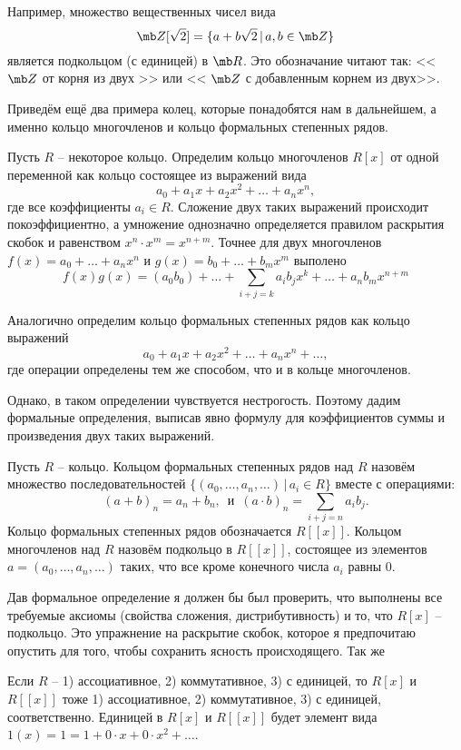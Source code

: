 \rm Например, множество вещественных чисел вида 
$$\mb Z[\sqrt{2}]=\{a+b\sqrt{2}\,|\, a,b \in \mb Z\} $$
является подкольцом (с единицей) в $\mb R$. Это обозначание читают так: << $\mb Z$ от корня из двух >> или << $\mb Z$ с добавленным корнем из двух>>. 
\erm




Приведём ещё два примера колец, которые понадобятся нам в дальнейшем, а именно кольцо многочленов и кольцо
формальных степенных рядов.



 Пусть $R$ – некоторое кольцо. Определим кольцо многочленов $R[x]$ от
одной переменной как кольцо состоящее из выражений вида
$$a_0+a_1x+a_2x^2+\dots+a_nx^n,$$
где все коэффициенты $a_i\in R$. Сложение двух таких выражений происходит покоэффициентно, а умножение однозначно определяется правилом раскрытия скобок и равенством $x^n\cdot x^m=x^{n+m}.$ Точнее для двух многочленов $f(x)=a_0+\dots+a_nx^n$ и $g(x)=b_0+\dots+b_mx^m$ выполено
$$f(x)g(x)= (a_0b_0)+ \dots+\sum_{i+j=k}a_ib_j x^k+\dots+a_nb_mx^{n+m}$$
\edfn

 Аналогично определим кольцо формальных степенных рядов как кольцо выражений
$$a_0+a_1x+a_2x^2+\dots+a_nx^n+\dots,$$
где операции определены тем же способом, что и в кольце многочленов.
\edfn

Однако, в таком определении чувствуется нестрогость. Поэтому дадим формальные определения, выписав явно формулу для коэффициентов суммы и произведения двух таких выражений.

 Пусть $R$ -- кольцо. Кольцом формальных степенных рядов над $R$ назовём множество последовательностей $\{(a_0,\dots,a_n, \dots)\,|\, a_i\in R\}$ вместе с операциями:
$$ (a+b)_n=a_n+b_n, \, \text{ и } \, (a\cdot b)_n=\sum_{i+j=n}a_ib_j.$$
Кольцо формальных степенных рядов обозначается $R[[x]]$. Кольцом многочленов над $R$ назовём подкольцо в $R[[x]]$,
состоящее из элементов $a=(a_0,\dots,a_n,\dots)$ таких, что все кроме конечного числа $a_i$ равны $0$.
\edfn

Дав формальное определение я должен бы был проверить, что выполнены все требуемые аксиомы (свойства сложения, дистрибутивность) и то, что $R[x]$ -- подкольцо. Это упражнение на раскрытие скобок, которое я предпочитаю опустить для того, чтобы сохранить ясность происходящего. Так же

\rm Если $R$ -- 1) ассоциативное, 2) коммутативное, 3) с единицей, то $R[x]$ и $R[[x]]$ тоже 1) ассоциативное, 2) коммутативное, 3) с единицей, соответственно.
Единицей в $R[x]$ и $R[[x]]$ будет элемент вида $1(x)=1=1+0\cdot x+0\cdot x^2+\dots$.
\erm


